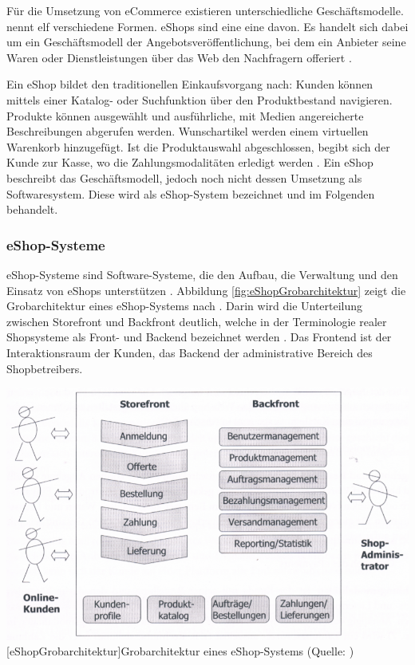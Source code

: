 \documentclass[11pt, a4paper, titlepage, listof=totoc, bibliography=totoc, index=totoc, twoside, openright, headings=normal]{scrreprt}
\begin{document}
Für die Umsetzung von eCommerce existieren unterschiedliche Geschäftsmodelle. \citet{timmers98} nennt elf verschiedene Formen. eShops sind eine eine davon. Es handelt sich dabei um ein \glqq Geschäftsmodell der Angebotsveröffentlichung, bei dem ein Anbieter seine Waren oder Dienstleistungen über das Web den Nachfragern offeriert\grqq{} \citep{bartelt00}.

Ein eShop bildet den traditionellen Einkaufsvorgang nach: Kunden können mittels einer Katalog- oder Suchfunktion über den Produktbestand navigieren. Produkte können ausgewählt und ausführliche, mit Medien angereicherte Beschreibungen abgerufen werden. Wunschartikel werden einem virtuellen Warenkorb hinzugefügt. Ist die Produktauswahl abgeschlossen, begibt sich der Kunde zur \glqq Kasse\grqq{}, wo die Zahlungsmodalitäten erledigt werden \citep{boles00}. Ein eShop beschreibt das Geschäftsmodell, jedoch noch nicht dessen Umsetzung als Softwaresystem. Diese wird als eShop-System bezeichnet \citep{boles00} und im Folgenden behandelt.

\subsubsection{eShop-Systeme}
\glqq eShop-Systeme sind Software-Systeme, die den Aufbau, die Verwaltung und den Einsatz von eShops unterstützen\grqq{} \citep{boles00}. Abbildung \ref{fig:eShopGrobarchitektur} zeigt die Grobarchitektur eines eShop-Systems nach \citeauthor{meier12}. Darin wird die Unterteilung zwischen Storefront und Backfront deutlich, welche in der Terminologie realer Shopsysteme als Front- und Backend bezeichnet werden \citep[vgl.][]{shopwareDoku}. Das Frontend ist der Interaktionsraum der Kunden, das Backend der administrative Bereich des Shopbetreibers.

\vspace{1em}
\begin{minipage}{\linewidth}
	\centering
	\includegraphics[width=0.7\linewidth]{Abbildungen/eShopGrobarchitektur.png}
	[eShopGrobarchitektur]{Grobarchitektur eines eShop-Systems (Quelle: \citet{meier12})}
	\label{fig:eShopGrobarchitektur}
\end{minipage}
\vspace{1em}
\end{document}
